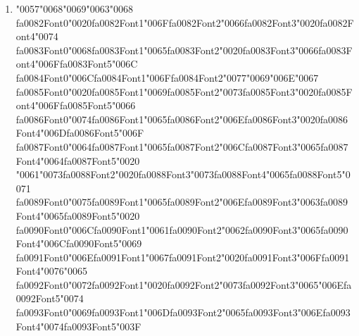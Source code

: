 \documentclass[11pt]{article}
\begin{document}
\begin{enumerate}[label=Q\arabic*., leftmargin=*]
\item {\char"0057}{\char"0068}{\char"0069}{\char"0063}{\char"0068} {\csname fa0082Font0\endcsname\char"0020}{\csname fa0082Font1\endcsname\char"006F}{\csname fa0082Font2\endcsname\char"0066}{\csname fa0082Font3\endcsname\char"0020}{\csname fa0082Font4\endcsname\char"0074} {\csname fa0083Font0\endcsname\char"0068}{\csname fa0083Font1\endcsname\char"0065}{\csname fa0083Font2\endcsname\char"0020}{\csname fa0083Font3\endcsname\char"0066}{\csname fa0083Font4\endcsname\char"006F}{\csname fa0083Font5\endcsname\char"006C} {\csname fa0084Font0\endcsname\char"006C}{\csname fa0084Font1\endcsname\char"006F}{\csname fa0084Font2\endcsname\char"0077}{\char"0069}{\char"006E}{\char"0067} {\csname fa0085Font0\endcsname\char"0020}{\csname fa0085Font1\endcsname\char"0069}{\csname fa0085Font2\endcsname\char"0073}{\csname fa0085Font3\endcsname\char"0020}{\csname fa0085Font4\endcsname\char"006F}{\csname fa0085Font5\endcsname\char"0066} {\csname fa0086Font0\endcsname\char"0074}{\csname fa0086Font1\endcsname\char"0065}{\csname fa0086Font2\endcsname\char"006E}{\csname fa0086Font3\endcsname\char"0020}{\csname fa0086Font4\endcsname\char"006D}{\csname fa0086Font5\endcsname\char"006F} {\csname fa0087Font0\endcsname\char"0064}{\csname fa0087Font1\endcsname\char"0065}{\csname fa0087Font2\endcsname\char"006C}{\csname fa0087Font3\endcsname\char"0065}{\csname fa0087Font4\endcsname\char"0064}{\csname fa0087Font5\endcsname\char"0020} {\char"0061}{\char"0073}{\csname fa0088Font2\endcsname\char"0020}{\csname fa0088Font3\endcsname\char"0073}{\csname fa0088Font4\endcsname\char"0065}{\csname fa0088Font5\endcsname\char"0071} {\csname fa0089Font0\endcsname\char"0075}{\csname fa0089Font1\endcsname\char"0065}{\csname fa0089Font2\endcsname\char"006E}{\csname fa0089Font3\endcsname\char"0063}{\csname fa0089Font4\endcsname\char"0065}{\csname fa0089Font5\endcsname\char"0020} {\csname fa0090Font0\endcsname\char"006C}{\csname fa0090Font1\endcsname\char"0061}{\csname fa0090Font2\endcsname\char"0062}{\csname fa0090Font3\endcsname\char"0065}{\csname fa0090Font4\endcsname\char"006C}{\csname fa0090Font5\endcsname\char"0069} {\csname fa0091Font0\endcsname\char"006E}{\csname fa0091Font1\endcsname\char"0067}{\csname fa0091Font2\endcsname\char"0020}{\csname fa0091Font3\endcsname\char"006F}{\csname fa0091Font4\endcsname\char"0076}{\char"0065} {\csname fa0092Font0\endcsname\char"0072}{\csname fa0092Font1\endcsname\char"0020}{\csname fa0092Font2\endcsname\char"0073}{\csname fa0092Font3\endcsname\char"0065}{\char"006E}{\csname fa0092Font5\endcsname\char"0074} {\csname fa0093Font0\endcsname\char"0069}{\csname fa0093Font1\endcsname\char"006D}{\csname fa0093Font2\endcsname\char"0065}{\csname fa0093Font3\endcsname\char"006E}{\csname fa0093Font4\endcsname\char"0074}{\csname fa0093Font5\endcsname\char"003F}


\end{enumerate}
\end{document}
